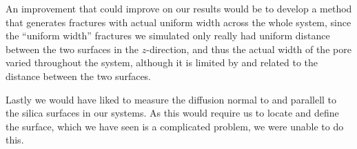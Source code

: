 An improvement that could improve on our results would be to develop a method that generates fractures with actual uniform width across the whole system, since the ``uniform width'' fractures we simulated only really had uniform distance between the two surfaces in the $z$-direction, and thus the actual width of the pore varied throughout the system, although it is limited by and related to the distance between the two surfaces.

Lastly we would have liked to measure the diffusion normal to and parallell to the silica surfaces in our systems. As this would require us to locate and define the surface, which we have seen is a complicated problem, we were unable to do this.


